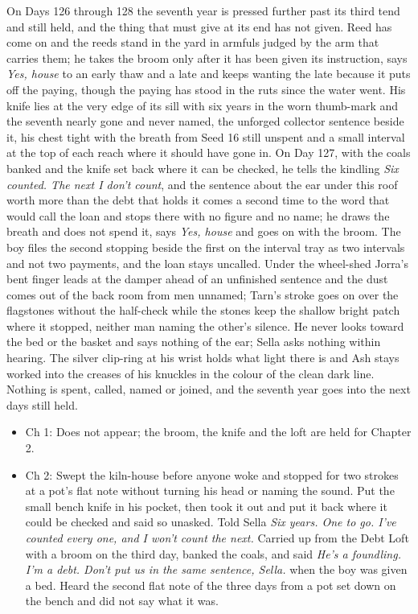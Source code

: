\documentclass{design/chronicle}
\begin{document}
{On Days 126 through 128 the seventh year is pressed further past its third tend and still held, and the thing that must give at its end has not given. Reed has come on and the reeds stand in the yard in armfuls judged by the arm that carries them; he takes the broom only after it has been given its instruction, says \emph{Yes, house} to an early thaw and a late and keeps wanting the late because it puts off the paying, though the paying has stood in the ruts since the water went. His knife lies at the very edge of its sill with six years in the worn thumb-mark and the seventh nearly gone and never named, the unforged collector sentence beside it, his chest tight with the breath from Seed 16 still unspent and a small interval at the top of each reach where it should have gone in. On Day 127, with the coals banked and the knife set back where it can be checked, he tells the kindling \emph{Six counted. The next I don’t count}, and the sentence about the ear under this roof worth more than the debt that holds it comes a second time to the word that would call the loan and stops there with no figure and no name; he draws the breath and does not spend it, says \emph{Yes, house} and goes on with the broom. The boy files the second stopping beside the first on the interval tray as two intervals and not two payments, and the loan stays uncalled. Under the wheel-shed Jorra’s bent finger leads at the damper ahead of an unfinished sentence and the dust comes out of the back room from men unnamed; Tarn’s stroke goes on over the flagstones without the half-check while the stones keep the shallow bright patch where it stopped, neither man naming the other’s silence. He never looks toward the bed or the basket and says nothing of the ear; Sella asks nothing within hearing. The silver clip-ring at his wrist holds what light there is and Ash stays worked into the creases of his knuckles in the colour of the clean dark line. Nothing is spent, called, named or joined, and the seventh year goes into the next days still held.

\begin{itemize}[leftmargin=1.4em,itemsep=1pt,topsep=3pt,parsep=0pt]

\item Ch 1: Does not appear; the broom, the knife and the loft are held for Chapter 2.

\item Ch 2: Swept the kiln-house before anyone woke and stopped for two strokes at a pot’s flat note without turning his head or naming the sound. Put the small bench knife in his pocket, then took it out and put it back where it could be checked and said so unasked. Told Sella \emph{Six years. One to go. I’ve counted every one, and I won’t count the next.} Carried up from the Debt Loft with a broom on the third day, banked the coals, and said \emph{He’s a foundling. I’m a debt. Don’t put us in the same sentence, Sella.} when the boy was given a bed. Heard the second flat note of the three days from a pot set down on the bench and did not say what it was.


\end{itemize}}
\end{document}
